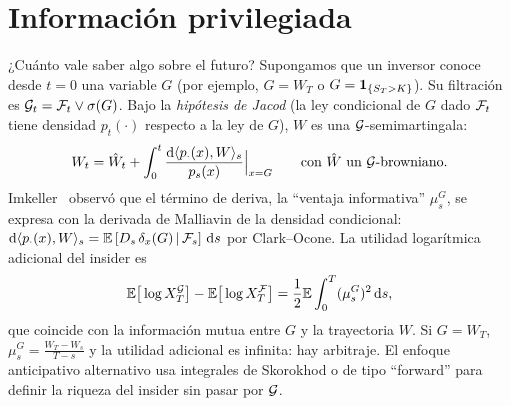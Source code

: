 \section{Información privilegiada}
¿Cuánto vale saber algo sobre el futuro? Supongamos que un inversor conoce desde $t=0$ una
variable $G$ (por ejemplo, $G=W_T$ o $G=\mathbf{1}_{\{S_T>K\}}$). Su filtración es $\mathcal{G}_t=\mathcal{F}_t\vee\sigma(G)$. Bajo la
\emph{hipótesis de Jacod} (la ley condicional de $G$ dado $\mathcal{F}_t$ tiene densidad $p_t(\cdot)$ respecto a la ley de $G$),
$W$ es una $\mathcal{G}$-semimartingala:
\[
  W_t=\hat W_t+\int_0^t\frac{\mathrm{d}\langle p_\cdot(x),W\rangle_s}{p_s(x)}\Big|_{x=G}\qquad\text{con }\hat W\text{ un }\mathcal{G}\text{-browniano}.
\]
Imkeller~\cite{Imkeller03} observó que el término de deriva, la ``ventaja informativa'' $\mu^G_s$, se expresa con
la derivada de Malliavin de la densidad condicional: $\mathrm{d}\langle p_\cdot(x),W\rangle_s=\mathbb{E}\left[D_s\,\delta_x(G)\,\middle|\,\mathcal{F}_s\right]\,\mathrm{d} s$ por
Clark--Ocone. La utilidad logarítmica adicional del insider es
\[
  \mathbb{E}\big[\log X^{\mathcal{G}}_T\big]-\mathbb{E}\big[\log X^{\mathcal{F}}_T\big]=\frac12\mathbb{E}\int_0^T(\mu^G_s)^2\,\mathrm{d} s,
\]
que coincide con la información mutua entre $G$ y la trayectoria $W$. Si $G=W_T$, $\mu^G_s=\frac{W_T-W_s}{T-s}$ y
la utilidad adicional es infinita: hay arbitraje. El enfoque anticipativo alternativo usa integrales
de Skorokhod o de tipo ``forward'' para definir la riqueza del insider sin pasar por $\mathcal{G}$.
